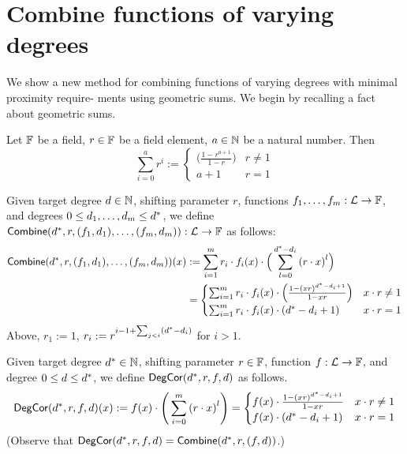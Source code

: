 \section{Combine functions of varying degrees}\label{sec:combine}
We show a new method for combining functions of varying degrees with minimal proximity require- ments using geometric sums. We begin by recalling a fact about geometric sums.

\begin{fact}\label{fact:geometric_sum}
    Let $\mathbb{F}$ be a field, $r\in\mathbb{F}$ be a field element, $a\in\mathbb{N}$ be a natural number. Then
    \[
        \sum_{i=0}^{a}r^i:=
        \begin{cases}
        \Big(\frac{1-r^{a+1}}{1-r}\Big) & r\neq 1 \\
        a+1 & r=1
        \end{cases}
    \]
\end{fact}

\begin{definition}\label{def:combine}
    Given target degree $d\in\mathbb{N}$, shifting parameter $r$, functions $f_1,\ldots,f_m:\mathcal{L}\rightarrow\mathbb{F}$, and degrees $0\leq d_1,\ldots,d_m\leq {d}^*$, we define $\mathsf{Combine}(d^*,r,(f_1,d_1),\ldots,(f_m,d_m)):\mathcal{L}\rightarrow\mathbb{F}$ as follows:
    \begin{align*}
        \mathsf{Combine}({d}^*,r,(f_1,d_1),\ldots,(f_m,d_m))(x)&:=\sum_{i=1}^{m}r_i\cdot f_i(x)\cdot \Big(\sum_{l=0}^{d^*-d_i}{(r\cdot x)}^l\Big) \\
        &= 
        \begin{cases}
            \sum_{i=1}^{m}r_i\cdot f_i(x)\cdot \Big(\frac{1-{(xr)}^{d^*-d_i+1}}{1-xr}\Big) & x\cdot r\neq 1\\
            \sum_{i=1}^{m}r_i\cdot f_i(x)\cdot (d^*-d_i+1) & x\cdot r= 1
        \end{cases}
    \end{align*}
Above, $r_1:=1$, $r_i:=r^{i-1+\sum_{j<i}(d^*-d_i)}$ for $i>1$.
\end{definition}

\begin{definition}\label{def:deg_corr}
{}
    Given target degree $d^*\in\mathbb{N}$, shifting parameter $r\in\mathbb{F}$, function $f:\mathcal{L}\rightarrow\mathbb{F}$, and degree $0\leq d\leq d^*$, we define $\mathsf{DegCor}(d^*,r,f,d)$ as follows.
    \[
        \mathsf{DegCor}(d^*,r,f,d)(x):=f(x)\cdot\Bigg(\sum_{i=0}^{m}{(r\cdot x)}^l\Bigg)=
        \begin{cases}
            f(x)\cdot\frac{1-{(xr)}^{d^*-d_i+1}}{1-xr} & x\cdot r\neq 1\\
            f(x)\cdot (d^*-d_i+1) & x\cdot r= 1
        \end{cases}
    \]
(Observe that $\mathsf{DegCor}(d^*,r,f,d)=\mathsf{Combine}(d^*,r,(f,d))$.)
\end{definition}

